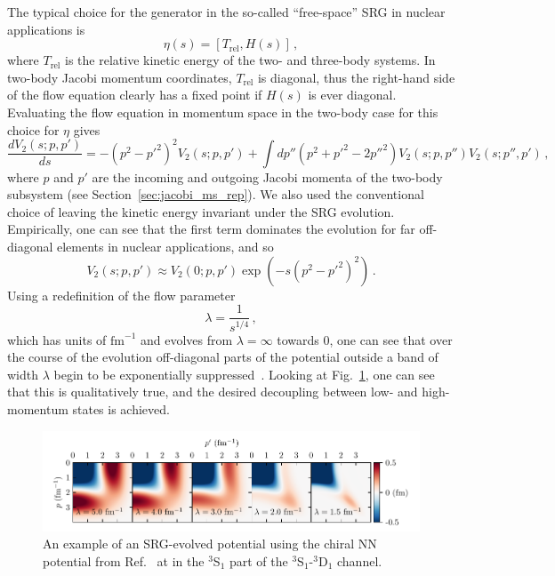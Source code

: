 The typical choice for the generator in the so-called ``free-space'' SRG in nuclear applications is
\begin{equation}
  \eta(s) = [T_{\text{rel}}, H(s)]\,,
\end{equation}
where $T_{\text{rel}}$ is the relative kinetic energy of the two- and three-body systems.
In two-body Jacobi momentum coordinates, $T_{\text{rel}}$ is diagonal,
thus the right-hand side of the flow equation clearly has a fixed point if $H(s)$ is ever diagonal.
Evaluating the flow equation in momentum space in the two-body case for this choice for $\eta$ gives
\begin{equation}
  \frac{dV_2(s; p, p')}{ds} = - {(p^2 - {p'}^2)}^2 V_2(s; p, p') + \int dp'' (p^2 + {p'}^2 - 2 {p''}^2) V_2(s; p, p'') V_2(s; p'', p')\,,
\end{equation}
where $p$ and $p'$ are the incoming and outgoing Jacobi momenta of the two-body subsystem
(see Section~\ref{sec:jacobi_ms_rep}).
We also used the conventional choice of leaving the kinetic energy invariant under the SRG evolution.
Empirically, one can see that the first term dominates the evolution for far off-diagonal elements in nuclear applications,
and so
\begin{equation}
  V_2(s; p, p') \approx V_2(0; p, p') \exp(- s {(p^2 - {p'}^2)}^2)\,.
\end{equation}
Using a redefinition of the flow parameter
\begin{equation}
  \lambda = \frac{1}{s^{1/4}}\,,
\end{equation}
which has units of $\text{fm}^{-1}$ and evolves from $\lambda=\infty$ towards 0,
one can see that over the course of the evolution
off-diagonal parts of the potential outside a band of width $\lambda$ begin to be exponentially suppressed~\cite{Jurg07srgdec}.
Looking at Fig.~\ref{fig:srg_evolved_potential}, one can see that this is qualitatively true,
and the desired decoupling between low- and high-momentum states is achieved.

\begin{figure}[t]
  \centering
  \includegraphics[width=\textwidth]{thesis/doc/images/vnn_srg_emn500_n3lo.pdf}
  \caption[
    An example of an SRG-evolved potential using the chiral EMN NN potential
    at \nfourlo{}
    in the ${}^3$S${}_1$ part of the ${}^3$S${}_1$-${}^3$D${}_1$ channel.
  ]{
    An example of an SRG-evolved potential using the chiral NN potential
    from Ref.~\cite{Ente17n4lonn} at \nfourlo{}
    in the ${}^3$S${}_1$ part of the ${}^3$S${}_1$-${}^3$D${}_1$ channel.
  }\label{fig:srg_evolved_potential}
\end{figure}

